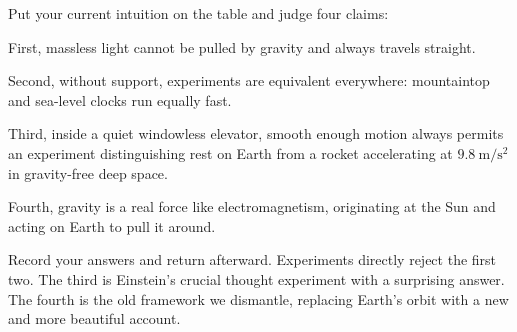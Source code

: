 
\begin{mainline}
Put your current intuition on the table and judge four claims:

First, massless light cannot be pulled by gravity and always travels straight.

Second, without support, experiments are equivalent everywhere: mountaintop and sea-level clocks run equally fast.

Third, inside a quiet windowless elevator, smooth enough motion always permits an experiment distinguishing rest on Earth from a rocket accelerating at \(9.8\ \mathrm{m/s^{2}}\) in gravity-free deep space.

Fourth, gravity is a real force like electromagnetism, originating at the Sun and acting on Earth to pull it around.

Record your answers and return afterward. Experiments directly reject the first two. The third is Einstein's crucial thought experiment with a surprising answer. The fourth is the old framework we dismantle, replacing Earth's orbit with a new and more beautiful account.
\end{mainline}


